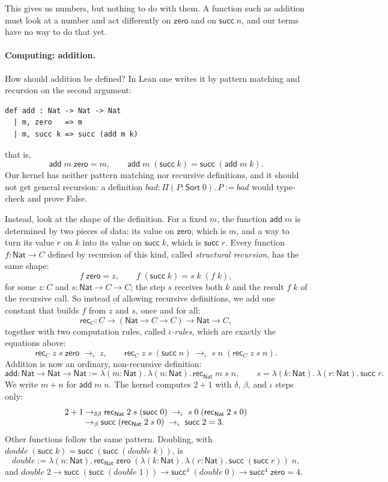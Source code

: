 \documentclass[acmsmall,screen,nonacm]{acmart}
\newcommand{\Sort}[1]{\mathsf{Sort}\;#1}
\newcommand{\tPi}[3]{\Pi(#1{:}#2).\,#3}
\newcommand{\tLam}[3]{\lambda(#1{:}#2).\,#3}
\newcommand{\Nat}{\mathsf{Nat}}
\newcommand{\zero}{\mathsf{zero}}
\newcommand{\tsucc}{\mathsf{succ}}
\newcommand{\add}{\mathsf{add}}
\newcommand{\iotared}{\to_{\iota}}
\begin{document}
This gives us numbers, but nothing to do with them.
A function such as addition must look at a number and act differently on $\zero$ and on $\tsucc\;n$, and our terms have no way to do that yet.

\paragraph{Computing: addition.}
How should addition be defined?
In Lean one writes it by pattern matching and recursion on the second argument:
\begin{lstlisting}[numbers=none, columns=fullflexible, keepspaces=true]
def add : Nat -> Nat -> Nat
  | m, zero   => m
  | m, succ k => succ (add m k)
\end{lstlisting}
that is,
\[
\add\;m\;\zero = m, \qquad \add\;m\;(\tsucc\;k) = \tsucc\;(\add\;m\;k).
\]
Our kernel has neither pattern matching nor recursive definitions, and it should not get general recursion:
a definition $\mathit{bad} : \tPi{P}{\Sort{0}}{P} \mathrel{:=} \mathit{bad}$ would type-check and prove False.

Instead, look at the shape of the definition.
For a fixed $m$, the function $\add\;m$ is determined by two pieces of data:
its value on $\zero$, which is $m$, and a way to turn its value $r$ on $k$ into its value on $\tsucc\;k$, which is $\tsucc\;r$.
Every function $f : \Nat \to C$ defined by recursion of this kind, called \emph{structural recursion}, has the same shape:
\[
f\;\zero = z, \qquad f\;(\tsucc\;k) = s\;k\;(f\;k),
\]
for some $z : C$ and $s : \Nat \to C \to C$; the step $s$ receives both $k$ and the result $f\;k$ of the recursive call.
So instead of allowing recursive definitions, we add one constant that builds $f$ from $z$ and $s$, once and for all:
\[
\mathsf{rec}_C : C \to (\Nat \to C \to C) \to \Nat \to C,
\]
together with two computation rules, called \emph{$\iota$-rules}, which are exactly the equations above:
\[
\mathsf{rec}_C\;z\;s\;\zero \;\iotared\; z,
\qquad
\mathsf{rec}_C\;z\;s\;(\tsucc\;n) \;\iotared\; s\;n\;(\mathsf{rec}_C\;z\;s\;n).
\]
Addition is now an ordinary, non-recursive definition:
\[
\add : \Nat \to \Nat \to \Nat \mathrel{:=} \tLam{m}{\Nat}{\tLam{n}{\Nat}{\mathsf{rec}_{\Nat}\;m\;s\;n}},
\qquad
s = \tLam{k}{\Nat}{\tLam{r}{\Nat}{\tsucc\;r}}.
\]
We write $m + n$ for $\add\;m\;n$.
The kernel computes $2 + 1$ with $\delta$, $\beta$, and $\iota$ steps only:
\[
\begin{array}{r@{\;}l}
2 + 1
&\to_{\delta\beta} \mathsf{rec}_{\Nat}\;2\;s\;(\tsucc\;0)
\;\iotared\; s\;0\;(\mathsf{rec}_{\Nat}\;2\;s\;0) \\
&\to_{\beta} \tsucc\;(\mathsf{rec}_{\Nat}\;2\;s\;0)
\;\iotared\; \tsucc\;2 = 3.
\end{array}
\]
Other functions follow the same pattern. Doubling, with $\mathit{double}\;(\tsucc\;k) = \tsucc\;(\tsucc\;(\mathit{double}\;k))$, is
\[
\mathit{double} \mathrel{:=} \tLam{n}{\Nat}{\mathsf{rec}_{\Nat}\;\zero\;(\tLam{k}{\Nat}{\tLam{r}{\Nat}{\tsucc\;(\tsucc\;r)}})\;n},
\]
and $\mathit{double}\;2 \to \tsucc\;(\tsucc\;(\mathit{double}\;1)) \to \tsucc^4\;(\mathit{double}\;0) \to \tsucc^4\;\zero = 4$.
\end{document}
